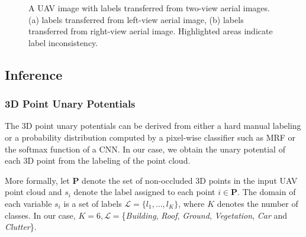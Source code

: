 \begin{figure}[htb]
\begin{subfigure}{0.485\columnwidth}
   \caption{}  
 \end{subfigure}
 
\caption{A UAV image with labels transferred from two-view aerial images. (a) labels transferred from left-view aerial image, (b) labels transferred from right-view aerial image. Highlighted areas indicate label inconsistency.}
\label{fig:eichenau_transferred}
\end{figure}


\subsection{Inference}
\subsubsection{3D Point Unary Potentials}The 3D point unary potentials can be derived from either a hard manual labeling or a probability distribution computed by a pixel-wise classifier such as MRF or the softmax function of a CNN. In our case, we obtain the unary potential of each 3D point from the labeling of the point cloud. 

More formally, let $\mathbf{P}$ denote the set of non-occluded 3D points in the input UAV point cloud and $s_i$ denote the label assigned to each point $i\in \mathbf{P}$. The domain of each variable $s_i$ is a set of labels $\mathcal{L} = \{l_1, \dots, l_K\}$, where $K$ denotes the number of classes. In our case, $K = 6, \mathcal{L} = $\big\{\textit{Building}, \textit{Roof}, \textit{Ground}, \textit{Vegetation}, \textit{Car} and \textit{Clutter}\big\}. 

